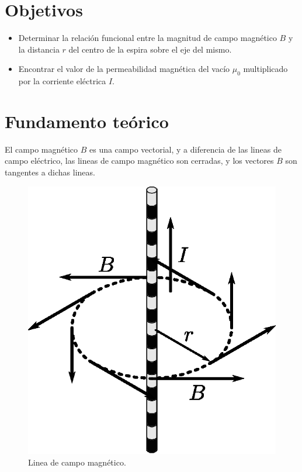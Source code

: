 \documentclass[letter,11pt]{article}
\begin{document}
\section{Objetivos}
\begin{itemize}
\item Determinar la relación funcional entre la magnitud de campo magnético $B$
y la distancia $r$ del centro de la espira sobre el eje del mismo.
\item Encontrar el valor de la permeabilidad magnética del vacío $\mu_0$
multiplicado por la corriente eléctrica $I$.
\end{itemize}

\section{Fundamento teórico}
El campo magnético $B$ es una campo vectorial, y a diferencia de las lineas de
campo eléctrico, las lineas de campo magnético son cerradas, y los vectores $B$
son tangentes a dichas lineas.

\begin{figure}[!h]
\centering
\includegraphics[scale=0.75]{resources/f1.eps}
\caption{Linea de campo magnético.}
\label{figura1}
\end{figure}
\end{document}
